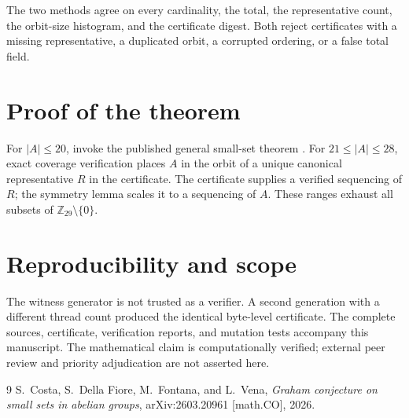 \documentclass[11pt]{article}
\begin{document}
The two methods agree on every cardinality, the total, the representative count, the orbit-size histogram, and the certificate digest. Both reject certificates with a missing representative, a duplicated orbit, a corrupted ordering, or a false total field.

\section{Proof of the theorem}
For $|A|\le20$, invoke the published general small-set theorem \cite{costa2026}. For $21\le|A|\le28$, exact coverage verification places $A$ in the orbit of a unique canonical representative $R$ in the certificate. The certificate supplies a verified sequencing of $R$; the symmetry lemma scales it to a sequencing of $A$. These ranges exhaust all subsets of $\mathbb Z_{29}\setminus\{0\}$.

\section{Reproducibility and scope}
The witness generator is not trusted as a verifier. A second generation with a different thread count produced the identical byte-level certificate. The complete sources, certificate, verification reports, and mutation tests accompany this manuscript. The mathematical claim is computationally verified; external peer review and priority adjudication are not asserted here.

\begin{thebibliography}{9}
S.~Costa, S.~Della Fiore, M.~Fontana, and L.~Vena,
\emph{Graham conjecture on small sets in abelian groups},
arXiv:2603.20961 [math.CO], 2026.
\end{thebibliography}
\end{document}
